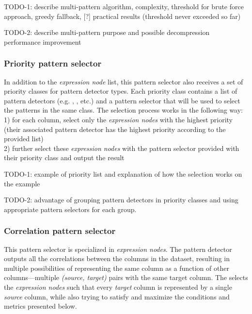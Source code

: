 TODO-1: describe multi-pattern algorithm, complexity, threshold for brute force approach, greedy fallback, [?] practical results (threshold never exceeded so far)

TODO-2: describe multi-pattern purpose and possible decompression performance improvement

\subsubsection{Priority pattern selector}
\label{subsubsec:ps:priority}

In addition to the \textit{expression node} list, this pattern selector also receives a set of priority classes for pattern detector types. Each priority class contains a list of pattern detectors (e.g. , , etc.) and a pattern selector that will be used to select the patterns in the same class. The selection process works in the following way:\\
1) for each column, select only the \textit{expression nodes} with the highest priority (their associated pattern detector has the highest priority according to the provided list)\\
2) further select these \textit{expression nodes} with the pattern selector provided with their priority class and output the result

TODO-1: example of priority list and explanation of how the selection works on the example

TODO-2: advantage of grouping pattern detectors in priority classes and using appropriate pattern selectors for each group.

\subsubsection{Correlation pattern selector}
\label{subsubsec:ps:correlation}

This pattern selector is specialized in  \textit{expression nodes}. The  pattern detector outputs all the correlations between the columns in the dataset, resulting in multiple possibilities of representing the same column as a function of other columns---multiple \textit{(source, target)} pairs with the same target column. The  selects the \textit{expression nodes} such that every \textit{target} column is represented by a single \textit{source} column, while also trying to satisfy and maximize the conditions and metrics presented below.

